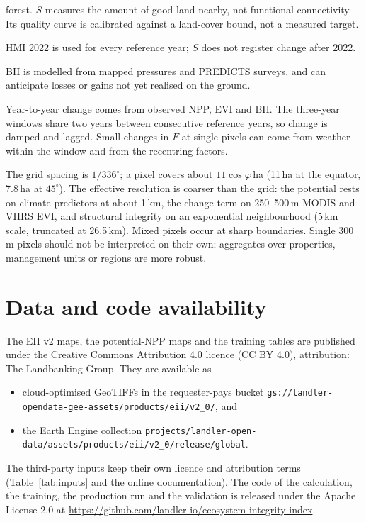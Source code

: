\documentclass[11pt,a4paper]{article}
\begin{document}
\begin{description}[leftmargin=1.2em]
forest. $S$ measures the amount of good land nearby, not functional connectivity. Its quality
curve is calibrated against a land-cover bound, not a measured target.
\item[Static structure.] HMI 2022 is used for every reference year; $S$ does not register change
after 2022.
\item[Modelled composition.] BII is modelled from mapped pressures and PREDICTS surveys, and can
anticipate losses or gains not yet realised on the ground.
\item[Annual change.] Year-to-year change comes from observed NPP, EVI and BII. The three-year
windows share two years between consecutive reference years, so change is damped and lagged. Small
changes in $F$ at single pixels can come from weather within the window and from the recentring
factors.
\item[Resolution.] The grid spacing is $1/336^\circ$; a pixel covers about $11\cos\varphi$\,ha
(11\,ha at the equator, 7.8\,ha at $45^\circ$). The effective resolution is coarser than the grid:
the potential rests on climate predictors at about 1\,km, the change term on 250--500\,m MODIS
and VIIRS EVI, and structural integrity on an exponential neighbourhood (5\,km scale, truncated at 26.5\,km). Mixed pixels occur
at sharp boundaries. Single 300\,m pixels should not be interpreted on their own; aggregates over
properties, management units or regions are more robust.
\end{description}

\section*{Data and code availability}

The EII v2 maps, the potential-NPP maps and the training tables are published under the Creative
Commons Attribution 4.0 licence (CC BY 4.0), attribution: The Landbanking Group. They are
available as
\begin{itemize}
\item cloud-optimised GeoTIFFs in the requester-pays bucket
\nolinkurl{gs://landler-opendata-gee-assets/products/eii/v2_0/}, and
\item the Earth Engine collection
\nolinkurl{projects/landler-open-data/assets/products/eii/v2_0/release/global}.
\end{itemize}
The third-party
inputs keep their own licence and attribution terms (Table~\ref{tab:inputs} and the online
documentation). The code of the calculation, the training, the production run and the validation
is released under the Apache License 2.0 at
\url{https://github.com/landler-io/ecosystem-integrity-index}.
\end{document}
